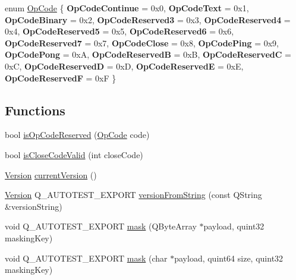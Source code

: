 \begin{DoxyCompactItemize}
enum \mbox{\hyperlink{namespace_q_web_socket_protocol_a93d3033ae9be614a2bc8f76c792e2e14}{Op\+Code}} \{ \newline
{\bfseries Op\+Code\+Continue} = 0x0, 
{\bfseries Op\+Code\+Text} = 0x1, 
{\bfseries Op\+Code\+Binary} = 0x2, 
{\bfseries Op\+Code\+Reserved3} = 0x3, 
\newline
{\bfseries Op\+Code\+Reserved4} = 0x4, 
{\bfseries Op\+Code\+Reserved5} = 0x5, 
{\bfseries Op\+Code\+Reserved6} = 0x6, 
{\bfseries Op\+Code\+Reserved7} = 0x7, 
\newline
{\bfseries Op\+Code\+Close} = 0x8, 
{\bfseries Op\+Code\+Ping} = 0x9, 
{\bfseries Op\+Code\+Pong} = 0xA, 
{\bfseries Op\+Code\+ReservedB} = 0xB, 
\newline
{\bfseries Op\+Code\+ReservedC} = 0xC, 
{\bfseries Op\+Code\+ReservedD} = 0xD, 
{\bfseries Op\+Code\+ReservedE} = 0xE, 
{\bfseries Op\+Code\+ReservedF} = 0xF
 \}
\end{DoxyCompactItemize}
\subsection*{Functions}
\begin{DoxyCompactItemize}
\item 
bool \mbox{\hyperlink{namespace_q_web_socket_protocol_aa92196a840dd7588e5e7745439d01b84}{is\+Op\+Code\+Reserved}} (\mbox{\hyperlink{namespace_q_web_socket_protocol_a93d3033ae9be614a2bc8f76c792e2e14}{Op\+Code}} code)
\item 
bool \mbox{\hyperlink{namespace_q_web_socket_protocol_a201c6003f6d4aebf169228aeae467fc2}{is\+Close\+Code\+Valid}} (int close\+Code)
\item 
\mbox{\hyperlink{namespace_q_web_socket_protocol_ad53f2684577effe0a517eadb48714df3}{Version}} \mbox{\hyperlink{namespace_q_web_socket_protocol_a4f5541729d50349cf34835b5080abe18}{current\+Version}} ()
\item 
\mbox{\hyperlink{namespace_q_web_socket_protocol_ad53f2684577effe0a517eadb48714df3}{Version}} Q\+\_\+\+A\+U\+T\+O\+T\+E\+S\+T\+\_\+\+E\+X\+P\+O\+RT \mbox{\hyperlink{namespace_q_web_socket_protocol_a9cb6b4d3ddbfacaccd73f4188da2bd5e}{version\+From\+String}} (const Q\+String \&version\+String)
\item 
void Q\+\_\+\+A\+U\+T\+O\+T\+E\+S\+T\+\_\+\+E\+X\+P\+O\+RT \mbox{\hyperlink{namespace_q_web_socket_protocol_aea90bd0da715cf6b30e614c8891e09ad}{mask}} (Q\+Byte\+Array $\ast$payload, quint32 masking\+Key)
\item 
void Q\+\_\+\+A\+U\+T\+O\+T\+E\+S\+T\+\_\+\+E\+X\+P\+O\+RT \mbox{\hyperlink{namespace_q_web_socket_protocol_a2e4aa8206ec620864463ef4a30816b58}{mask}} (char $\ast$payload, quint64 size, quint32 masking\+Key)
\end{DoxyCompactItemize}


